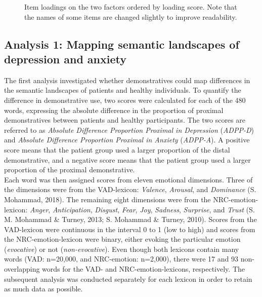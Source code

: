 \documentclass[11pt, a4paper]{article}
\begin{document}
 
\begin{figure}
\centering
\vspace{-2cm}

\caption{\label{fig:data} Item loadings on the two factors ordered by loading score. Note that the names of some items are changed slightly to improve readability.}
\end{figure}


\newpage

\subsection{Analysis 1: Mapping semantic landscapes of depression and anxiety}
The first analysis investigated whether demonstratives could map differences in the semantic landscapes of patients and healthy individuals. To quantify the difference in demonstrative use, two scores were calculated for each of the 480 words, expressing the absolute difference in the proportion of proximal demonstratives between patients and healthy participants. The two scores are referred to as \textit{Absolute Difference Proportion Proximal in Depression} (\textit{ADPP-D}) and \textit{Absolute Difference Proportion Proximal in Anxiety} (\textit{ADPP-A}). A positive score means that the patient group used a larger proportion of the distal demonstrative, and a negative score means that the patient group used a larger proportion of the proximal demonstrative.\\

Each word was then assigned scores from eleven emotional dimensions. Three of the dimensions were from the VAD-lexicon: \textit{Valence}, \textit{Arousal}, and \textit{Dominance} (S. Mohammad, 2018). The remaining eight dimensions were from the NRC-emotion-lexicon: \textit{Anger}, \textit{Anticipation}, \textit{Disgust}, \textit{Fear}, \textit{Joy}, \textit{Sadness}, \textit{Surprise}, and \textit{Trust} (S. M. Mohammad \& Turney, 2013; S. Mohammad \& Turney, 2010). Scores from the VAD-lexicon were continuous in the interval 0 to 1 (low to high) and scores from the NRC-emotion-lexicon were binary, either evoking the particular emotion (\textit{evocative}) or not (\textit{non-evocative}).
Even though both lexicons contain many words (VAD: n=20,000, and NRC-emotion: n=2,000), there were 17 and 93 non-overlapping words for the VAD- and NRC-emotion-lexicons, respectively. The subsequent analysis was conducted separately for each lexicon in order to retain as much data as possible.\\ 
\end{document}
